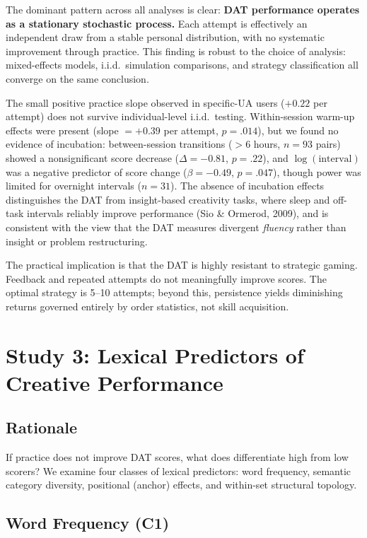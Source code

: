 \documentclass[12pt]{article}
\begin{document}
The dominant pattern across all analyses is clear: \textbf{DAT performance operates as a stationary stochastic process.} Each attempt is effectively an independent draw from a stable personal distribution, with no systematic improvement through practice. This finding is robust to the choice of analysis: mixed-effects models, i.i.d.\ simulation comparisons, and strategy classification all converge on the same conclusion.

The small positive practice slope observed in specific-UA users ($+0.22$ per attempt) does not survive individual-level i.i.d.\ testing. Within-session warm-up effects were present (slope $= +0.39$ per attempt, $p = .014$), but we found no evidence of incubation: between-session transitions ($> 6$ hours, $n = 93$ pairs) showed a nonsignificant score decrease ($\Delta = -0.81$, $p = .22$), and $\log(\text{interval})$ was a negative predictor of score change ($\beta = -0.49$, $p = .047$), though power was limited for overnight intervals ($n = 31$). The absence of incubation effects distinguishes the DAT from insight-based creativity tasks, where sleep and off-task intervals reliably improve performance (Sio \& Ormerod, 2009), and is consistent with the view that the DAT measures divergent \textit{fluency} rather than insight or problem restructuring.

The practical implication is that the DAT is highly resistant to strategic gaming. Feedback and repeated attempts do not meaningfully improve scores. The optimal strategy is 5--10 attempts; beyond this, persistence yields diminishing returns governed entirely by order statistics, not skill acquisition.

\section{Study 3: Lexical Predictors of Creative Performance}

\subsection{Rationale}

If practice does not improve DAT scores, what does differentiate high from low scorers? We examine four classes of lexical predictors: word frequency, semantic category diversity, positional (anchor) effects, and within-set structural topology.

\subsection{Word Frequency (C1)}
\end{document}
